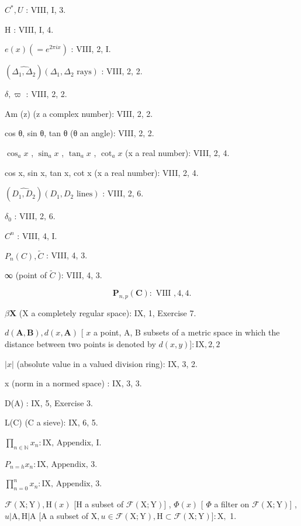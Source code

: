 \(C^{*}, U\) : VIII, I, 3.

H : VIII, I, 4.

\(e(x) (= e^{2\pi ix})\) : VIII, 2, I.

\((\widehat{\Delta_{1}, \Delta_{2}})(\Delta_{1}, \Delta_{2}\text{ rays})\) : VIII, 2, 2.

\(\delta, \varpi\) : VIII, 2, 2.

Am (z) (z a complex number): VIII, 2, 2.

cos θ, sin θ, tan θ (θ an angle): VIII, 2, 2.

\(\cos_{a}x\) , \(\sin_{a}x\) , \(\tan_{a}x\) , \(\cot_{a}x\) (x a real number): VIII, 2, 4.

cos x, sin x, tan x, cot x (x a real number): VIII, 2, 4.

\((\widehat{D_{1}, D_{2}})(D_{1}, D_{2}\text{ lines})\) : VIII, 2, 6.

\(\delta_{0}\) : VIII, 2, 6.

\(C^{n}\) : VIII, 4, I.

\(P_{n}(C), \tilde{C}\) : VIII, 4, 3.

∞ (point of \(\tilde{C}\) ): VIII, 4, 3.

\[
\mathbf {P} _ {n, p} (\mathbf {C}): \text { VIII }, 4, 4.
\]

\(\beta \mathbf{X}\) (X a completely regular space): IX, 1, Exercise 7.

\(d(\mathbf{A}, \mathbf{B}), d(x, \mathbf{A})\) {[} \(x\) a point, A, B subsets of a metric space in which the distance between two points is denoted by \(d(x, y)] : \mathrm{IX}, 2, 2\)

\(|x|\) (absolute value in a valued division ring): IX, 3, 2.

\textbar\textbar x\textbar\textbar{} (norm in a normed space) : IX, 3, 3.

D(A) : IX, 5, Exercise 3.

L(C) (C a sieve): IX, 6, 5.

\(\prod_{n \in \mathbb{N}} x_n : \text{IX, Appendix, I.}\)

\(P_{n=h} x_n : \text{IX, Appendix, 3.}\)

\(\prod_{n=0}^{n} x_n: \text{IX, Appendix, 3.}\)

\(\mathcal{F}(\mathrm{X};\mathrm{Y}),\mathrm{H}(x)\) {[}H a subset of \(\mathcal{F}(\mathrm{X};\mathrm{Y})]\) , \(\Phi (x)\) {[} \(\Phi\) a filter on \(\mathcal{F}(\mathrm{X};\mathrm{Y})]\) , \(u|\mathrm{A},\mathrm{H}|\mathrm{A}\) {[}A a subset of \(\mathrm{X},u\in \mathcal{F}(\mathrm{X};\mathrm{Y}),\mathrm{H}\subset \mathcal{F}(\mathrm{X};\mathrm{Y})]:\mathrm{X},\) 1.

